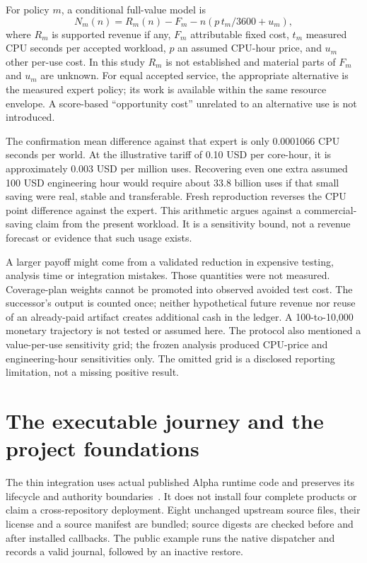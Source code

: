 For policy $m$, a conditional full-value model is
\begin{equation}
 N_m(n)=R_m(n)-F_m-n\left(p\,t_m/3600+u_m\right),
 \label{eq:value}
\end{equation}
where $R_m$ is supported revenue if any, $F_m$ attributable fixed cost, $t_m$ measured CPU seconds per accepted workload, $p$ an assumed CPU-hour price, and $u_m$ other per-use cost. In this study $R_m$ is not established and material parts of $F_m$ and $u_m$ are unknown. For equal accepted service, the appropriate alternative is the measured expert policy; its work is available within the same resource envelope. A score-based ``opportunity cost'' unrelated to an alternative use is not introduced.

The confirmation mean difference against that expert is only 0.0001066 CPU seconds per world. At the illustrative tariff of 0.10 USD per core-hour, it is approximately 0.003 USD per million uses. Recovering even one extra assumed 100 USD engineering hour would require about 33.8 billion uses if that small saving were real, stable and transferable. Fresh reproduction reverses the CPU point difference against the expert. This arithmetic argues against a commercial-saving claim from the present workload. It is a sensitivity bound, not a revenue forecast or evidence that such usage exists.

A larger payoff might come from a validated reduction in expensive testing, analysis time or integration mistakes. Those quantities were not measured. Coverage-plan weights cannot be promoted into observed avoided test cost. The successor's output is counted once; neither hypothetical future revenue nor reuse of an already-paid artifact creates additional cash in the ledger. A 100-to-10,000 monetary trajectory is not tested or assumed here. The protocol also mentioned a value-per-use sensitivity grid; the frozen analysis produced CPU-price and engineering-hour sensitivities only. The omitted grid is a disclosed reporting limitation, not a missing positive result.

\FloatBarrier
\section{The executable journey and the project foundations}
\label{sec:architecture}
The thin integration uses actual published Alpha runtime code and preserves its lifecycle and authority boundaries~\cite{montrealai2026alpha,montrealai2026successorarchitecture,montrealai2026successorprotocol}. It does not install four complete products or claim a cross-repository deployment. Eight unchanged upstream source files, their license and a source manifest are bundled; source digests are checked before and after installed callbacks. The public example runs the native dispatcher and records a valid journal, followed by an inactive restore.

